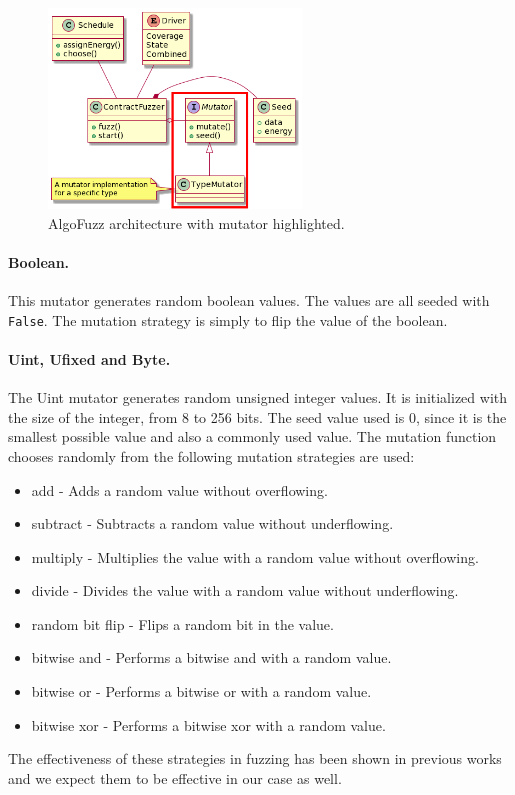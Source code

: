 \begin{figure}[htbp]
    \centering
    \includegraphics[width=0.6\textwidth]{figures/architecture-mutator-square.png}
    \caption{AlgoFuzz architecture with mutator highlighted.}\label{fig:architecture-mutator}
\end{figure}

\paragraph{Boolean.} This mutator generates random boolean values. The values are all seeded with \texttt{False}.
The mutation strategy is simply to flip the value of the boolean.

\paragraph{Uint, Ufixed and Byte.}
The Uint mutator generates random unsigned integer values. It is initialized with the size of the integer, from 8 to 256 bits. The seed value used is 0, since it is the smallest possible value and also a commonly used value. The mutation function chooses randomly from the following mutation strategies are used:
\begin{itemize}
    \item add - Adds a random value without overflowing.
    \item subtract - Subtracts a random value without underflowing.
    \item multiply - Multiplies the value with a random value without overflowing.
    \item divide - Divides the value with a random value without underflowing.
    \item random bit flip - Flips a random bit in the value.
    \item bitwise and - Performs a bitwise and with a random value.
    \item bitwise or - Performs a bitwise or with a random value.
    \item bitwise xor - Performs a bitwise xor with a random value.
\end{itemize}
The effectiveness of these strategies in fuzzing has been shown in previous works and we expect them to be effective in our case as well.

